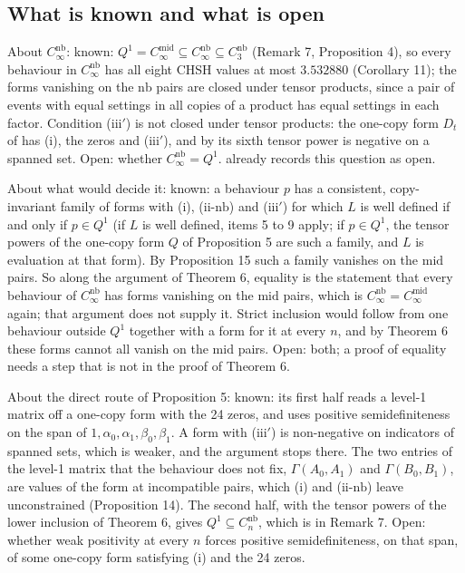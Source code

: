 \documentclass[11pt,a4paper]{article}
\theoremstyle{definition}
\theoremstyle{remark}
\newcommand{\nb}{\mathrm{nb}}
\newcommand{\md}{\mathrm{mid}}
\begin{document}
\subsection{What is known and what is open}

About $C_\infty^{\nb}$: known: $Q^1 = C_\infty^{\md} \subseteq C_\infty^{\nb} \subseteq C_3^{\nb}$ (Remark 7, Proposition 4), so every behaviour in $C_\infty^{\nb}$ has all eight CHSH values at most $3.532880$ (Corollary 11); the forms vanishing on the $\nb$ pairs are closed under tensor products, since a pair of events with equal settings in all copies of a product has equal settings in each factor. Condition (iii$'$) is not closed under tensor products: the one-copy form $D_t$ of \cite[Theorem 5(b)]{R7} has (i), the zeros and (iii$'$), and by \cite[Proposition 10]{R7} its sixth tensor power is negative on a spanned set. Open: whether $C_\infty^{\nb} = Q^1$. \cite[Remark 15]{R7} already records this question as open.

About what would decide it: known: a behaviour $p$ has a consistent, copy-invariant family of forms with (i), (ii-$\nb$) and (iii$'$) for which $L$ is well defined if and only if $p \in Q^1$ (if $L$ is well defined, items 5 to 9 apply; if $p \in Q^1$, the tensor powers of the one-copy form $Q$ of Proposition 5 are such a family, and $L$ is evaluation at that form). By Proposition 15 such a family vanishes on the $\md$ pairs. So along the argument of Theorem 6, equality is the statement that every behaviour of $C_\infty^{\nb}$ has forms vanishing on the $\md$ pairs, which is $C_\infty^{\nb} = C_\infty^{\md}$ again; that argument does not supply it. Strict inclusion would follow from one behaviour outside $Q^1$ together with a form for it at every $n$, and by Theorem 6 these forms cannot all vanish on the $\md$ pairs. Open: both; a proof of equality needs a step that is not in the proof of Theorem 6.

About the direct route of Proposition 5: known: its first half reads a level-1 matrix off a one-copy form with the 24 zeros, and uses positive semidefiniteness on the span of $1, \alpha_0, \alpha_1, \beta_0, \beta_1$. A form with (iii$'$) is non-negative on indicators of spanned sets, which is weaker, and the argument stops there. The two entries of the level-1 matrix that the behaviour does not fix, $\Gamma(A_0, A_1)$ and $\Gamma(B_0, B_1)$, are values of the form at incompatible pairs, which (i) and (ii-$\nb$) leave unconstrained (Proposition 14). The second half, with the tensor powers of the lower inclusion of Theorem 6, gives $Q^1 \subseteq C_n^{\nb}$, which is in Remark 7. Open: whether weak positivity at every $n$ forces positive semidefiniteness, on that span, of some one-copy form satisfying (i) and the 24 zeros.
\end{document}
